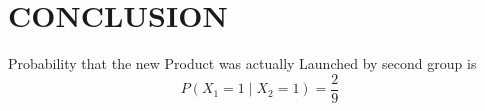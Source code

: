 \documentclass[journal,12pt,twocolumn]{IEEEtran}
\begin{document}
\section{CONCLUSION}
Probability that the new Product was actually Launched by second group is 
\begin{equation*}
   P(X_1=1\mid X_2=1)=\frac{2}{9}
\end{equation*}
\end{document}
